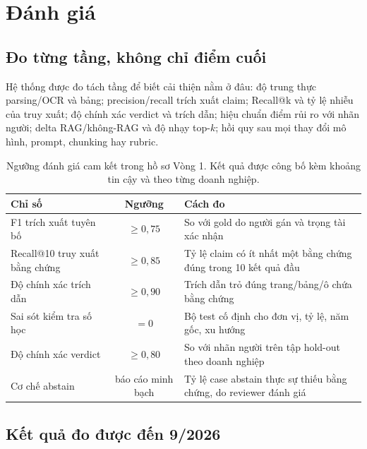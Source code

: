 \documentclass[11pt,a4paper]{article}
\begin{document}
\section{Đánh giá}

\subsection{Đo từng tầng, không chỉ điểm cuối}

Hệ thống được đo tách tầng để biết cải thiện nằm ở đâu: độ trung thực parsing/OCR và bảng; precision/recall trích xuất claim; Recall@k và tỷ lệ nhiễu của truy xuất; độ chính xác verdict và trích dẫn; hiệu chuẩn điểm rủi ro với nhãn người; delta RAG/không-RAG và độ nhạy top-$k$; hồi quy sau mọi thay đổi mô hình, prompt, chunking hay rubric.

\begin{table}[!htbp]\small
\begin{tabularx}{\linewidth}{X c X}
\toprule
\textbf{Chỉ số} & \textbf{Ngưỡng} & \textbf{Cách đo} \\
\midrule
F1 trích xuất tuyên bố & $\ge 0{,}75$ & So với gold do người gán và trọng tài xác nhận \\
Recall@10 truy xuất bằng chứng & $\ge 0{,}85$ & Tỷ lệ claim có ít nhất một bằng chứng đúng trong 10 kết quả đầu \\
Độ chính xác trích dẫn & $\ge 0{,}90$ & Trích dẫn trỏ đúng trang/bảng/ô chứa bằng chứng \\
Sai sót kiểm tra số học & $= 0$ & Bộ test cố định cho đơn vị, tỷ lệ, năm gốc, xu hướng \\
Độ chính xác verdict & $\ge 0{,}80$ & So với nhãn người trên tập hold-out theo doanh nghiệp \\
Cơ chế abstain & báo cáo minh bạch & Tỷ lệ case abstain thực sự thiếu bằng chứng, do reviewer đánh giá \\
\bottomrule
\end{tabularx}
\caption{Ngưỡng đánh giá cam kết trong hồ sơ Vòng 1. Kết quả được công bố kèm khoảng tin cậy và theo từng doanh nghiệp.}
\end{table}

\subsection{Kết quả đo được đến 9/2026}
\end{document}
